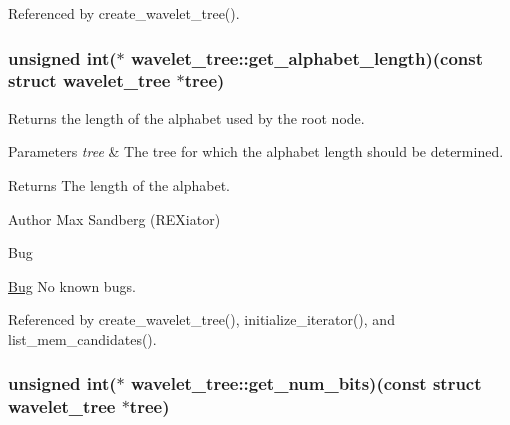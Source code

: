 \-Referenced by create\-\_\-wavelet\-\_\-tree().

\hypertarget{structwavelet__tree_a1905ffea2dc3815d49561237b4f8488a}{
\subsubsection[{get\-\_\-alphabet\-\_\-length}]{\setlength{\rightskip}{0pt plus 5cm}unsigned int($\ast$ {\bf wavelet\-\_\-tree\-::get\-\_\-alphabet\-\_\-length})(const struct {\bf wavelet\-\_\-tree} $\ast$tree)}}\label{structwavelet__tree_a1905ffea2dc3815d49561237b4f8488a}


\-Returns the length of the alphabet used by the root node. 


\begin{DoxyParams}{\-Parameters}
{\em tree} & \-The tree for which the alphabet length should be determined. \\
\hline
\end{DoxyParams}
\begin{DoxyReturn}{\-Returns}
\-The length of the alphabet. 
\end{DoxyReturn}
\begin{DoxyAuthor}{\-Author}
\-Max \-Sandberg (\-R\-E\-Xiator) 
\end{DoxyAuthor}
\begin{DoxyRefDesc}{\-Bug}
\item[\hyperlink{bug__bug000159}{\-Bug}]\-No known bugs. \end{DoxyRefDesc}


\-Referenced by create\-\_\-wavelet\-\_\-tree(), initialize\-\_\-iterator(), and list\-\_\-mem\-\_\-candidates().

\hypertarget{structwavelet__tree_aa66e703dce8676f909c1a461c40b5abf}{
\subsubsection[{get\-\_\-num\-\_\-bits}]{\setlength{\rightskip}{0pt plus 5cm}unsigned int($\ast$ {\bf wavelet\-\_\-tree\-::get\-\_\-num\-\_\-bits})(const struct {\bf wavelet\-\_\-tree} $\ast$tree)}}\label{structwavelet__tree_aa66e703dce8676f909c1a461c40b5abf}


